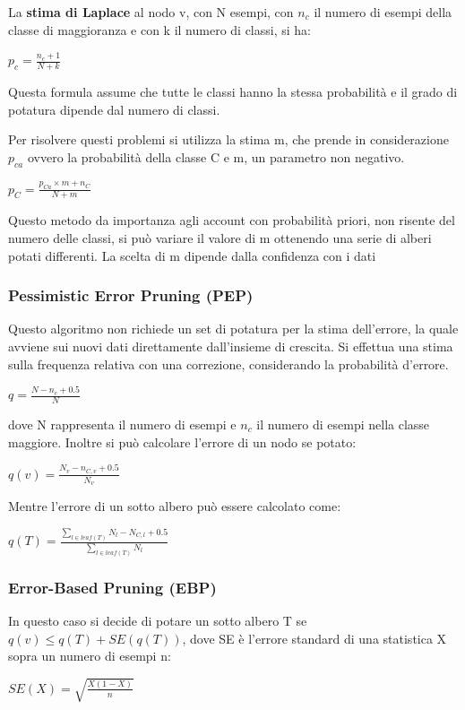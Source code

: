 \documentclass[a4paper]{extarticle}
\begin{document}
La \textbf{stima di Laplace} al nodo v, con N esempi, con $n_c$ il numero di esempi della classe di maggioranza e con k il numero di classi, si ha:

\begin{center}
$p_c = \frac{n_c+1}{N+k}$
\end{center}

Questa formula assume che tutte le classi hanno la stessa probabilità e il grado di potatura dipende dal numero di classi.

Per risolvere questi problemi si utilizza la stima m, che prende in considerazione $p_{ca}$ ovvero la probabilità della classe C e m, un parametro non negativo.

\begin{center}
$p_C = \frac{p_{Ca}\times m + n_C}{N+m}$
\end{center}
Questo metodo da importanza agli account con probabilità priori, non risente del numero delle classi, si può variare il valore di m ottenendo una serie di alberi potati differenti. La scelta di m dipende dalla confidenza con i dati

\subsubsection{Pessimistic Error Pruning (PEP)}

Questo algoritmo non richiede un set di potatura per la stima dell'errore, la quale avviene sui nuovi dati direttamente dall'insieme di crescita. Si effettua una stima sulla frequenza relativa con una correzione, considerando la probabilità d'errore.

\begin{center}
$ q = \frac{N-n_c+0.5}{N}$
\end{center}

dove N rappresenta il numero di esempi e $n_c$ il numero di esempi nella classe maggiore. Inoltre si può calcolare l'errore di un nodo se potato:

\begin{center}
$q(v) = \frac{N_v - n_{C,v} +0.5}{N_v}$
\end{center}

Mentre l'errore di un sotto albero può essere calcolato come:
\begin{center}
$q(T) = \frac{\sum\limits_{l \in leaf(T)} N_l - N_{C,l} + 0.5}{\sum\limits_{l \in leaf(T)} N_l} $
\end{center}

\subsubsection{Error-Based Pruning (EBP)}

In questo caso si decide di potare un sotto albero T se $q(v) \leq q(T) + SE(q(T))$, dove SE è l'errore standard di una statistica X sopra un numero di esempi n:
\begin{center}
$SE(X) = \sqrt{\frac{X(1-X)}{n}}$
\end{center}
\end{document}
